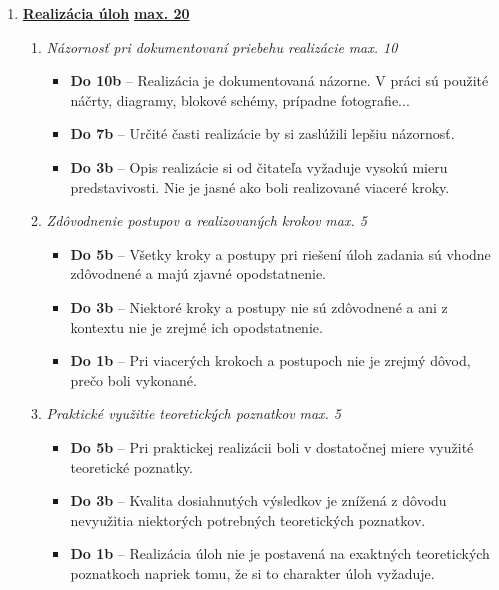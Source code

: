 \begin{enumerate}[label=\textbf{\arabic*.}]
    \item \underline{\textbf{Realizácia úloh}} \hfill \underline{\textbf{max. 20}}
    \begin{enumerate}
        \item \textit{Názornosť pri dokumentovaní priebehu realizácie} \hfill \textit{max. 10}
        \begin{itemize}
            \item \textbf{Do 10b} – Realizácia je dokumentovaná názorne. V práci sú použité náčrty, diagramy, blokové schémy, prípadne fotografie... 
            \item \textbf{Do 7b} – Určité časti realizácie by si zaslúžili lepšiu názornosť. 
            \item \textbf{Do 3b} – Opis realizácie si od čitateľa vyžaduje vysokú mieru predstavivosti. Nie je jasné ako boli realizované viaceré kroky. 
        \end{itemize}

        \item \textit{Zdôvodnenie postupov a realizovaných krokov} \hfill \textit{max. 5}
        \begin{itemize}
            \item \textbf{Do 5b} – Všetky kroky a postupy pri riešení úloh zadania sú vhodne zdôvodnené a majú zjavné opodstatnenie. 
            \item \textbf{Do 3b} – Niektoré kroky a postupy nie sú zdôvodnené a ani z kontextu nie je zrejmé ich opodstatnenie.
            \item \textbf{Do 1b} – Pri viacerých krokoch a postupoch nie je zrejmý dôvod, prečo boli vykonané. 
        \end{itemize}

        \item \textit{Praktické využitie teoretických poznatkov}  \hfill \textit{max. 5}
        \begin{itemize}
            \item \textbf{Do 5b} – Pri praktickej realizácii boli v dostatočnej miere využité teoretické poznatky. 
            \item \textbf{Do 3b} – Kvalita dosiahnutých výsledkov je znížená z dôvodu nevyužitia niektorých potrebných teoretických poznatkov.
            \item \textbf{Do 1b} – Realizácia úloh nie je postavená na exaktných teoretických poznatkoch napriek tomu, že si to charakter úloh vyžaduje. 
        \end{itemize}
    \end{enumerate}


\end{enumerate}
